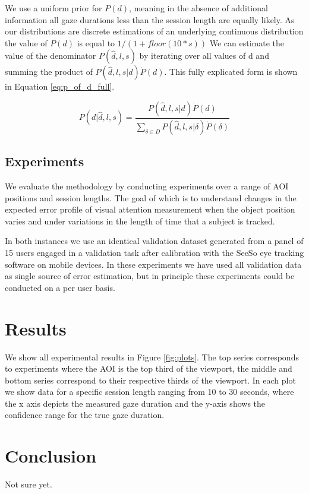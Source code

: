 \documentclass[12pt,a4paper]{article}
\numberwithin{equation}{section}
\begin{document}
We use a uniform prior for $P(d)$, meaning in the absence of additional information all
gaze durations less than the session length are equally likely. As our distributions are
discrete estimations of an underlying continuous distribution the value of $P(d)$ is
equal to $1/(1+floor(10*s))$
 We can estimate the value
of the denominator $P(\hat{d},l,s)$ by iterating over all values of d and summing the product
of $ P(\hat{d},l,s|d) \dot P(d)$. This fully explicated form is shown in 
Equation \ref{eq:p_of_d_full}.

\begin{equation}
\label{eq:p_of_d_full}
P(d|\hat{d},l,s) =  \frac{ P(\hat{d},l,s|d) \dot P(d) }{ \sum_{\delta \in D} P(\hat{d},l,s|\delta) \dot P(\delta)  }
\end{equation}

\subsection{Experiments}

We evaluate the methodology by conducting experiments over a range of AOI positions and session
lengths. The goal of which is to understand changes in the expected error profile of 
visual attention measurement when the object position varies and under variations in the
length of time that a subject is tracked.

In both instances we use an identical validation dataset generated from a panel of 15 users
engaged in a validation task after calibration with the SeeSo eye tracking software on mobile
devices. In these experiments we have used all validation data as single source of error 
estimation, but in principle these experiments could be conducted on a per user basis.

\section{Results}

We show all experimental results in Figure \ref{fig:plots}. The top series corresponds
to experiments where the AOI is the top third of the viewport, the middle and bottom 
series correspond to their respective thirds of the viewport. In each plot we show
data for a specific session length ranging from 10 to 30 seconds, where the x axis
depicts the measured gaze duration and the y-axis shows the confidence range for the
true gaze duration.  


\section{Conclusion}

Not sure yet.



\end{document}
